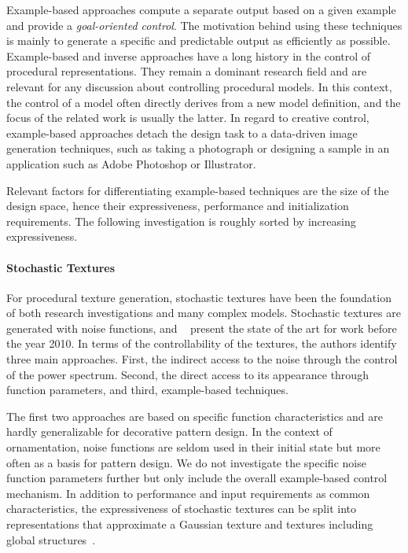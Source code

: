 Example-based approaches compute a separate output based on a given example and provide a \textit{goal-oriented control}. The motivation behind using these techniques is mainly to generate a specific and predictable output as efficiently as possible. Example-based and inverse approaches have a long history in the control of procedural representations. They remain a dominant research field and are relevant for any discussion about controlling procedural models. In this context, the control of a model often directly derives from a new model definition, and the focus of the related work is usually the latter. In regard to creative control, example-based approaches detach the design task to a data-driven image generation techniques, such as taking a photograph or designing a sample in an application such as Adobe Photoshop or Illustrator.

Relevant factors for differentiating example-based techniques are the size of the design space, hence their expressiveness, performance and initialization requirements. The following investigation is roughly sorted by increasing expressiveness.

\paragraph{Stochastic Textures}
\label{para:analysis_example_based_stochastic}




For procedural texture generation, stochastic textures have been the foundation of both research investigations and many complex models. Stochastic textures are generated with noise functions, and \citeauthor*{lagae_2010_sap}~\cite{lagae_2010_sap} present the state of the art for work before the year 2010. In terms of the controllability of the textures, the authors identify three main approaches. First, the indirect access to the noise through the control of the power spectrum. Second, the direct access to its appearance through function parameters, and 
third, example-based techniques. 

The first two approaches are based on specific function characteristics and are hardly generalizable for decorative pattern design. In the context of ornamentation, noise functions are seldom used in their initial state but more often as a basis for pattern design. We do not investigate the specific noise function parameters further but only include the overall example-based control mechanism. In addition to performance and input requirements as common characteristics, the expressiveness of stochastic textures can be split into representations that approximate a Gaussian texture and textures including global structures~\cite{galerne_2017_tno,lagae_2010_sap}.


